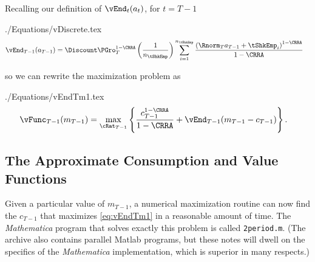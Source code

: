 \documentclass[titlepage]{\econtex}
\newcommand{\Mma}{\textit{Mathematica}}
\begin{document}
Recalling our definition of ${\vEnd}_{t}({a}_{t})$, for $t=T-1$
\begin{verbatimwrite}{./Equations/vDiscrete.tex}
  \begin{equation}\begin{gathered}\begin{aligned}
    \vEnd_{T-1}({a}_{T-1})  & =   \Discount \PGro_{T}^{1-\CRRA}\left(\frac{1}{n_{\tShkEmp}}\right)\sum_{i=1}^{n_{\tShkEmp}}   \frac{\left( \Rnorm_{T} {a}_{T-1} + \tShkEmp_{i}\right)^{1-\CRRA}}{1-\CRRA} \label{eq:vDiscrete}
  \end{aligned}\end{gathered}\end{equation}
\end{verbatimwrite}

so we can rewrite the maximization problem as 
\begin{verbatimwrite}{./Equations/vEndTm1.tex}
  \begin{equation}\begin{gathered}\begin{aligned}
    {\vFunc}_{T-1}({m}_{T-1})   & = \max_{\cRat_{T-1}}
                                     \left\{
                                     \frac{{c}_{T-1}^{1-\CRRA}}{1-\CRRA} +
                                     \vEnd_{T-1}({m}_{T-1}-{c}_{T-1})
                                     \right\}.
                                     \label{eq:vEndTm1}
  \end{aligned}\end{gathered}\end{equation}
\end{verbatimwrite}


\subsection{The Approximate Consumption and Value Functions}

Given a particular value of ${m}_{T-1}$, a numerical maximization
routine can now find the ${c}_{T-1}$ that maximizes
\eqref{eq:vEndTm1} in a reasonable amount of time.  The {\Mma} program that
solves exactly this problem is called \texttt{2period.m}.  (The archive also contains
parallel Matlab programs, but these notes will dwell on the specifics of the
{\Mma} implementation, which is superior in many respects.)
\end{document}
